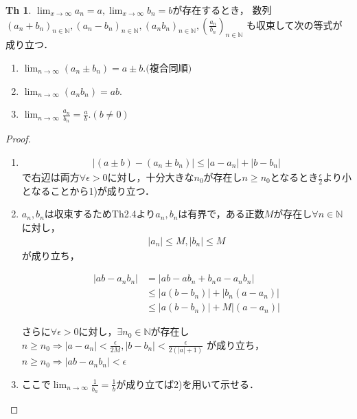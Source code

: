 \documentclass{ltjsarticle}
\theoremstyle{definition}
\newtheorem{thm}{Th}[subsection]
\theoremstyle{propcorollarystyle}
\theoremstyle{thmcorollarystyle}
\begin{document}
\begin{thm}
  $\lim_{x \rightarrow \infty} a_n=a,\lim_{x \rightarrow \infty} b_n=b$が存在するとき，
  数列$(a_n + b_n)_{n \in \mathbb{N}},(a_n - b_n)_{n \in \mathbb{N}},(a_n b_n)_{n \in \mathbb{N}},(\frac{a_n}{b_n})_{n \in \mathbb{N}}$
  も収束して次の等式が成り立つ．
  \begin{enumerate}[label={\arabic*}),itemsep=1em]
    \item $\lim_{n \rightarrow \infty} (a_n \pm b_n)=a \pm b.\text{(複合同順)}$
    \item $\lim_{n \rightarrow \infty} (a_n b_n)=ab.$
    \item $\lim_{n \rightarrow \infty} \frac{a_n}{b_n}=\frac{a}{b}. (b \neq 0)$
  \end{enumerate}
\end{thm}
\begin{proof}
  \begin{enumerate}[label={\arabic*}),itemsep=1em]
    \item \begin{align*}
      |(a \pm b) - (a_n \pm b_n)| \le |a-a_n|+|b-b_n|
    \end{align*}
    で右辺は両方$\forall \epsilon > 0$に対し，十分大きな$n_0$が存在し$n \ge n_0$となるとき$\frac{\epsilon}{2}$より小となることから1)が成り立つ．
    \item $a_n,b_n$は収束するためTh2.4より$a_n,b_n$は有界で，ある正数$M$が存在し$\forall n \in \mathbb{N}$に対し，
    \begin{align*}
     |a_n| \le M,|b_n| \le M
    \end{align*}
    が成り立ち，
    \noindent
    \hspace{4em}
    \begin{minipage}{\textwidth}
      \[
      \begin{aligned}
        |ab-a_n b_n|&=|ab-ab_n+b_n a-a_n b_n|\\
        &\le |a(b-b_n)|+|b_n(a-a_n)|\\
        &\le |a(b-b_n)|+M|(a-a_n)|
      \end{aligned}
      \]
    \end{minipage}
    さらに$\forall \epsilon >0$に対し，$\exists n_0 \in \mathbb{N}$が存在し
    \noindent
    $n \ge n_0 \Rightarrow |a-a_n|<\frac{\epsilon}{2M},|b-b_n|<\frac{\epsilon}{2(|a|+1)}$
    が成り立ち，$n \ge n_0 \Rightarrow |ab-a_n b_n|<\epsilon$
    \item ここで$\lim_{n \rightarrow \infty} \frac{1}{b_n}=\frac{1}{b}$が成り立てば2)を用いて示せる．

\end{enumerate}
\end{proof}
\end{document}
